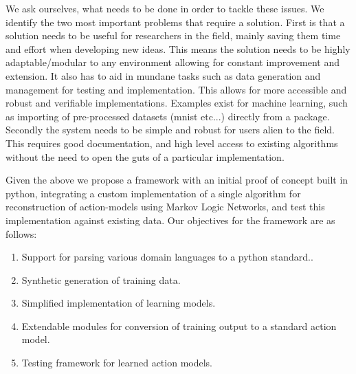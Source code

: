 % 
We ask ourselves, what needs to be done in order to tackle these issues. We identify the two most important problems that require a solution. First is that a solution needs to be useful for researchers in the field, mainly saving them time and effort when developing new ideas. This means the solution needs to be highly adaptable/modular to any environment allowing for constant improvement and extension. It also has to aid in mundane tasks such as data generation and management for testing and implementation. This allows for more accessible and robust and verifiable implementations. Examples exist for machine learning, such as importing of pre-processed datasets (mnist etc...) directly from a package. Secondly the system needs to be simple and robust for users alien to the field. This requires good documentation, and high level access to existing algorithms without the need to open the guts of a particular implementation.

Given the above we propose a framework with an initial proof of concept built in python, integrating a custom implementation of a single algorithm for reconstruction of action-models using Markov Logic Networks, and test this implementation against existing data.
Our objectives for the framework are as follows: \begin{enumerate}
                                                     \item Support for parsing various domain languages to a python standard..
                                                     \item Synthetic generation of training data.
                                                     \item Simplified implementation of learning models.
                                                     \item Extendable modules for conversion of training output to a standard action model.
                                                     \item Testing framework for learned action models.
\end{enumerate}
